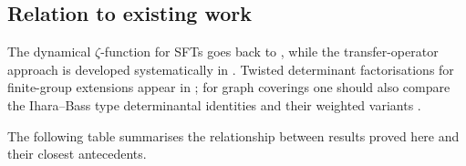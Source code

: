 \subsection{Relation to existing work}

The dynamical \(\zeta\)-function for SFTs goes back to
\cite{BowenLanford1970Zeta,Manning1971Axiom}, while the
transfer-operator approach is developed systematically in
\cite{Ruelle1976ZetaExpanding,Ruelle1978Thermodynamic,%
ParryPollicott1990Zeta,Baladi2000PositiveTransfer}.
Twisted determinant
factorisations for finite-group extensions appear in
\cite{ParryPollicott1986Chebotarev,%
NooraniParry1992ChebotarevShifts,%
PollicottSharp2007Chebotarev,%
BoyleSchmieding2017FiniteGroupExtensions,%
Parry1999LivsicNonAbelian};
for graph coverings one should also compare the Ihara--Bass type
determinantal identities and their weighted variants
\cite{Bass1992Ihara,%
ChoeKwakParkSato2007Bartholdi,%
Sato2008WeightedBartholdiCoverings}.

The following table summarises the relationship between results proved
here and their closest antecedents.

